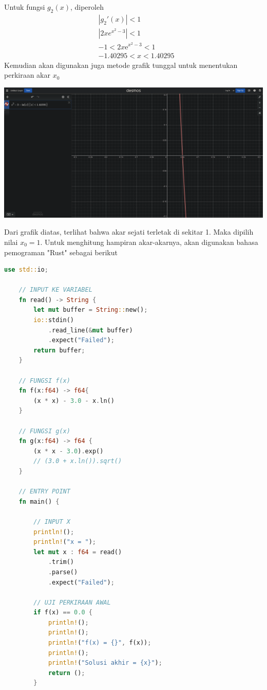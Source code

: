\documentclass[12pt]{article}
\begin{document}
\begin{enumerate}
{        Untuk fungsi $ g_2(x) $, diperoleh
        \begin{align*}
            & |g_2'(x)| < 1 \\
            & \left|2xe^{x^2-3}\right| < 1 \\ 
            & -1 < 2x\mathrm{e}^{x^2-3} < 1 \\
            & -1.40295 < x < 1.40295
        \end{align*}
        Kemudian akan digunakan juga metode grafik tunggal untuk menentukan perkiraan akar $ x_0 $
        \begin{center}
            \includegraphics[scale=0.2]{gambar2.png}  
        \end{center}
        Dari grafik diatas, terlihat bahwa akar sejati terletak di sekitar 1. Maka dipilih nilai $ x_0 = 1 $. Untuk menghitung hampiran akar-akarnya, akan digunakan bahasa pemograman "Rust" sebagai berikut
        \begin{lstlisting}[language=Rust, style=colouredRust]
    use std::io;

    // INPUT KE VARIABEL
    fn read() -> String {
        let mut buffer = String::new();
        io::stdin()
            .read_line(&mut buffer)
            .expect("Failed");
        return buffer;
    }

    // FUNGSI f(x)
    fn f(x:f64) -> f64{
        (x * x) - 3.0 - x.ln() 
    }

    // FUNGSI g(x)
    fn g(x:f64) -> f64 {
        (x * x - 3.0).exp()
        // (3.0 + x.ln()).sqrt()
    }

    // ENTRY POINT
    fn main() {
        
        // INPUT X
        println!();
        println!("x = ");
        let mut x : f64 = read()
            .trim()
            .parse()
            .expect("Failed");

        // UJI PERKIRAAN AWAL
        if f(x) == 0.0 {
            println!();
            println!();
            println!("f(x) = {}", f(x));
            println!();
            println!("Solusi akhir = {x}");
            return ();
        }


\end{lstlisting}}
\end{enumerate}
\end{document}
